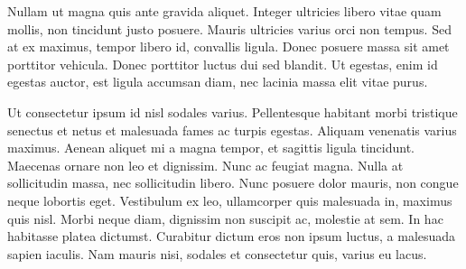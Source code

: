 Nullam ut magna quis ante gravida aliquet. Integer ultricies libero vitae quam mollis, non tincidunt justo posuere. Mauris ultricies varius orci non tempus. Sed at ex maximus, tempor libero id, convallis ligula. Donec posuere massa sit amet porttitor vehicula. Donec porttitor luctus dui sed blandit. Ut egestas, enim id egestas auctor, est ligula accumsan diam, nec lacinia massa elit vitae purus.

Ut consectetur ipsum id nisl sodales varius. Pellentesque habitant morbi tristique senectus et netus et malesuada fames ac turpis egestas. Aliquam venenatis varius maximus. Aenean aliquet mi a magna tempor, et sagittis ligula tincidunt. Maecenas ornare non leo et dignissim. Nunc ac feugiat magna. Nulla at sollicitudin massa, nec sollicitudin libero. Nunc posuere dolor mauris, non congue neque lobortis eget. Vestibulum ex leo, ullamcorper quis malesuada in, maximus quis nisl. Morbi neque diam, dignissim non suscipit ac, molestie at sem. In hac habitasse platea dictumst. Curabitur dictum eros non ipsum luctus, a malesuada sapien iaculis. Nam mauris nisi, sodales et consectetur quis, varius eu lacus.